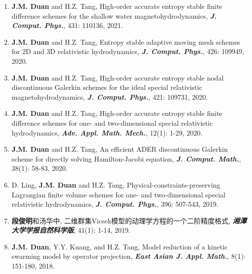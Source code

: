 

\setcounter{enum}{1}
\begin{enumerate}
  \item[\circenum] {\bfseries J.M. Duan} and H.Z. Tang, High-order accurate entropy stable finite difference schemes for
  the shallow water magnetohydrodynamics, {\em\bfseries J. Comput. Phys.}, 431: 110136, 2021.
  \item[\circenum] {\bfseries J.M. Duan} and H.Z. Tang, Entropy stable adaptive moving mesh schemes for 2D and 3D relativistic hydrodynamics,
                   {\em\bfseries J. Comput. Phys.}, 426: 109949, 2020.
  \item[\circenum] {\bfseries J.M. Duan} and H.Z. Tang, High-order accurate entropy stable nodal
                   discontinuous Galerkin schemes for the ideal special relativistic
                   magnetohydrodynamics, {\em\bfseries J. Comput. Phys.}, 421: 109731, 2020.
  \item[\circenum] {\bfseries J.M. Duan} and H.Z. Tang, High-order accurate entropy stable finite difference
                   schemes for one- and two-dimensional special relativistic hydrodynamics, {\em\bfseries Adv.
                   Appl. Math. Mech.}, 12(1): 1-29, 2020.
  \item[\circenum] {\bfseries J.M. Duan} and H.Z. Tang, An efficient ADER discontinuous Galerkin scheme for
                   directly solving Hamilton-Jacobi equation, {\em\bfseries J. Comput. Math.}, 38(1): 58-83, 2020.
  \item[\circenum] D. Ling, {\bfseries J.M. Duan} and H.Z. Tang, Physical-constraints-preserving Lagrangian
                   finite volume schemes for one- and two-dimensional special relativistic
                    hydrodynamics, {\em\bfseries J. Comput. Phys.}, 396: 507-543, 2019.
  \item[\circenum] {\bfseries 段俊明}和汤华中, 二维群集Vicsek模型的动理学方程的一个二阶精度格式,
                   {\em\bfseries 湘潭大学学报自然科学版}, 41(1): 1-14, 2019.
  \item[\circenum] {\bfseries J.M. Duan}, Y.Y. Kuang, and H.Z. Tang, Model reduction of a kinetic swarming
                    model by operator projection, {\em\bfseries East Asian J. Appl. Math.}, 8(1): 151-180, 2018.
\end{enumerate}

